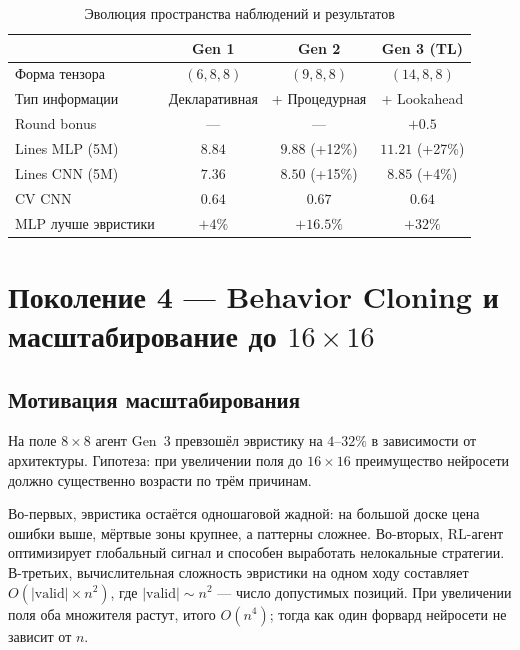 \documentclass[12pt, a4paper]{article}
\begin{document}
\begin{table}[H]
  \centering
  \caption{Эволюция пространства наблюдений и результатов}
  \label{tab:gen_compare}
  \small
  \begin{tabular}{lccc}
    \toprule
    & \textbf{Gen 1} & \textbf{Gen 2} & \textbf{Gen 3 (TL)} \\
    \midrule
    Форма тензора       & $(6,8,8)$ & $(9,8,8)$ & $(14,8,8)$ \\
    Тип информации      & Декларативная & + Процедурная & + Lookahead \\
    Round bonus         & --- & --- & $+0.5$ \\
    Lines MLP (5M)      & $8.84$ & $9.88$ (+12\%) & $11.21$ (+27\%) \\
    Lines CNN (5M)      & $7.36$ & $8.50$ (+15\%) & $8.85$ (+4\%) \\
    CV CNN              & $0.64$ & $0.67$ & $0.64$ \\
    MLP лучше эвристики & $+4\%$ & $+16.5\%$ & $+32\%$ \\
    \bottomrule
  \end{tabular}
\end{table}

\section{Поколение 4 --- Behavior Cloning и масштабирование до \texorpdfstring{$16\times16$}{16x16}}

\subsection{Мотивация масштабирования}

На поле $8\times8$ агент Gen~3 превзошёл эвристику на $4$--$32\%$ в зависимости от архитектуры. Гипотеза: при увеличении поля до $16\times16$ преимущество нейросети должно существенно возрасти по трём причинам.

Во-первых, эвристика остаётся одношаговой жадной: на большой доске цена ошибки выше, мёртвые зоны крупнее, а паттерны сложнее. Во-вторых, RL-агент оптимизирует глобальный сигнал и способен выработать нелокальные стратегии. В-третьих, вычислительная сложность эвристики на одном ходу составляет $O(|\text{valid}| \times n^2)$, где $|\text{valid}| \sim n^2$ --- число допустимых позиций. При увеличении поля оба множителя растут, итого $O(n^4)$; тогда как один форвард нейросети не зависит от $n$.
\end{document}
